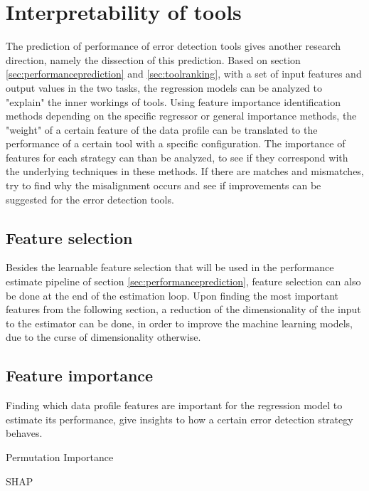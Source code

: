\section{Interpretability of tools}
\label{sec:interpretabilityoftools}
The prediction of performance of error detection tools gives another research direction, namely the dissection of this prediction.
Based on section \ref{sec:performanceprediction} and \ref{sec:toolranking}, with a set of input features and output values in the two tasks, the regression models can be analyzed to "explain" the inner workings of tools. Using feature importance identification methods depending on the specific regressor or general importance methods, the "weight" of a certain feature of the data profile can be translated to the performance of a certain tool with a specific configuration. The importance of features for each strategy can than be analyzed, to see if they correspond with the underlying techniques in these methods. If there are matches and mismatches, try to find why the misalignment occurs and see if improvements can be suggested for the error detection tools.

\subsection{Feature selection}
\label{subsec:featureselection}
Besides the learnable feature selection that will be used in the performance estimate pipeline of section \ref{sec:performanceprediction}, feature selection can also be done at the end of the estimation loop. Upon finding the most important features from the following section, a reduction of the dimensionality of the input to the estimator can be done, in order to improve the machine learning models, due to the curse of dimensionality otherwise. 

\subsection{Feature importance}
Finding which data profile features are important for the regression model to estimate its performance, give insights to how a certain error detection strategy behaves. 

Permutation Importance

SHAP